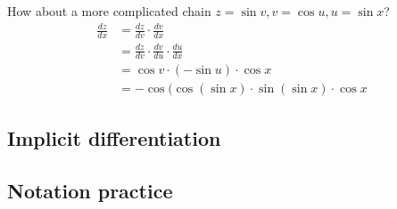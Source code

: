 How about a more complicated chain $z=\sin v, v=\cos u, u=\sin x$?
\begin{align*}
  \frac{dz}{dx}&=\frac{dz}{dv}\cdot \frac{dv}{dx}\\
               &=\frac{dz}{dv}\cdot \frac{dv}{du}\cdot \frac{du}{dx}\\
               &=\cos v \cdot (-\sin u)\cdot \cos x\\
               &=-\cos(\cos (\sin x)\cdot\sin (\sin x)\cdot \cos x
\end{align*}

\subsection{Implicit differentiation}

\subsection{Notation practice}


